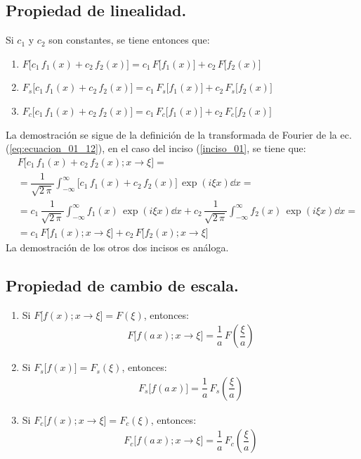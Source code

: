 \subsection{Propiedad de linealidad.}

Si $c_{1}$ y $c_{2}$ son constantes, se tiene entonces que:
\begin{enumerate}[\thesubsection .1)]
\item \label{inciso_01} $F \big[c_{1} \, f_{1} (x) + c_{2} \, f_{2} (x)\big] = c_{1} \, F \big[ f_{1} (x)\big] + c_{2} \, F \big[ f_{2} (x)\big]$
\item $F_{s} \big[c_{1} \, f_{1} (x) + c_{2} \, f_{2} (x)\big] = c_{1} \, F_{s} \big[ f_{1} (x)\big] + c_{2} \, F_{s} \big[ f_{2} (x)\big]$
\item $F_{c} \big[c_{1} \, f_{1} (x) + c_{2} \, f_{2} (x)\big] = c_{1} \, F_{c} \big[ f_{1} (x)\big] + c_{2} \, F_{c} \big[ f_{2} (x)\big]$
\end{enumerate}
La demostración se sigue de la definición de la transformada de Fourier de la ec. (\ref{eq:ecuacion_01_12}), en el caso del inciso (\ref{inciso_01}, se tiene que: 
\begin{align*}
&F \big[ c_{1} \, f_{1} (x) + c_{2} \, f_{2} (x) ; x \to \xi \big] = \\[0.5em]
&= \dfrac{1}{\sqrt{2 \, \pi}} \int_{-\infty}^{\infty} \big[ c_{1} \, f_{1} (x) + c_{2} \, f_{2} (x) \big] \, \exp(i \xi x) \dd{x} = \\[0.5em]
&= c_{1} \, \dfrac{1}{\sqrt{2 \, \pi}} \int_{-\infty}^{\infty} f_{1}(x) \, \exp(i \xi x) \dd{x} + c_{2} \, \dfrac{1}{\sqrt{2 \, \pi}} \int_{-\infty}^{\infty} f_{2}(x) \, \exp(i \xi x) \dd{x} = \\[0.5em]
&= c_{1} \, F \big[ f_{1} (x) ; x \to \xi \big] + c_{2} \, F \big[ f_{2} (x) ; x \to \xi \big]
\end{align*}
La demostración de los otros dos incisos es análoga.

\subsection{Propiedad de cambio de escala.}

\begin{enumerate}[\thesubsection .1)]
\item Si $F \big[ f(x); x \to \xi \big] = F(\xi)$, entonces:
\begin{align*}
F \big[ f(a \, x); x \to \xi \big] = \dfrac{1}{a} \, F \left( \dfrac{\xi}{a} \right)
\end{align*}
\item \label{inciso_01_06_01} Si $F_{s} \big[f(x)\big] = F_{s}(\xi)$, entonces:
\begin{align*}
F_{s} \big[f(a \, x)\big] = \dfrac{1}{a} \, F_{s} \left( \dfrac{\xi}{a} \right)
\end{align*}
\item Si $F_{c} \big[f(x); x \to \xi\big] = F_{c}(\xi)$, entonces:
\begin{align*}
F_{c} \big[f(a \, x); x \to \xi \big] = \dfrac{1}{a} \, F_{c} \left( \dfrac{\xi}{a} \right)
\end{align*}
\end{enumerate}

